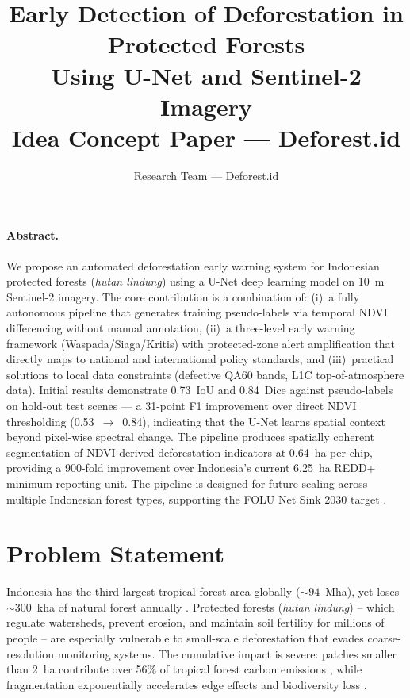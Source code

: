 \documentclass[10pt,a4paper,twocolumn]{article}
\title{\textbf{Early Detection of Deforestation in Protected Forests \\
Using U-Net and Sentinel-2 Imagery} \\
\small Idea Concept Paper --- Deforest.id}
\author{Research Team --- Deforest.id}
\date{}
\begin{document}
\maketitle
\thispagestyle{empty}

\paragraph{Abstract.}
We propose an automated deforestation early warning system for
Indonesian protected forests (\textit{hutan lindung}) using a U-Net
deep learning model on 10~m Sentinel-2 imagery. The core
contribution is a combination of: (i)~a fully autonomous pipeline
that generates training pseudo-labels via temporal NDVI
differencing without manual annotation, (ii)~a three-level early
warning framework (Waspada/Siaga/Kritis) with protected-zone alert
amplification that directly maps to national and international
policy standards, and (iii)~practical solutions to local data
constraints (defective QA60 bands, L1C top-of-atmosphere data).
Initial results demonstrate 0.73~IoU and 0.84~Dice against
pseudo-labels on hold-out test scenes --- a 31-point F1 improvement
over direct NDVI thresholding (0.53~$\to$~0.84), indicating that
the U-Net learns spatial context beyond pixel-wise spectral change.
The pipeline produces spatially coherent segmentation of
NDVI-derived deforestation indicators at 0.64~ha per chip,
providing a 900-fold improvement over Indonesia's current 6.25~ha
REDD+ minimum reporting unit. The pipeline is designed for future
scaling across multiple Indonesian forest types, supporting the
FOLU Net Sink 2030 target \cite{menlhk2022folu}.

\section{Problem Statement}
Indonesia has the third-largest tropical forest area globally
($\sim94$~Mha), yet loses $\sim300$~kha of natural forest annually
\cite{hansen2013high,fao2022sofo}. Protected forests (\textit{hutan lindung}) --
which regulate watersheds, prevent erosion, and maintain soil
fertility for millions of people -- are especially vulnerable to
small-scale deforestation that evades coarse-resolution monitoring
systems. The cumulative impact is severe: patches smaller than
2~ha contribute over 56\% of tropical forest carbon emissions
\cite{xu2026nature}, while fragmentation exponentially accelerates
edge effects and biodiversity loss \cite{taubert2018fragmentation}.
\end{document}
